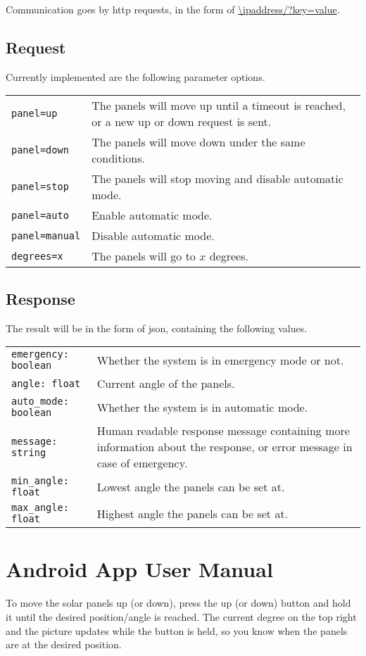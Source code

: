 

Communication goes by http requests, in the form of \url{\ipaddress/?key=value}.

\subsection{Request}
Currently implemented are the following parameter options.

\begin{tabular}{ll}
    \verb|panel=up| & The panels will move up until a timeout is reached, or a new up or down request is sent. \\
    \verb|panel=down| & The panels will move down under the same conditions. \\
    \verb|panel=stop| & The panels will stop moving and disable automatic mode. \\
    \verb|panel=auto| & Enable automatic mode. \\
    \verb|panel=manual| & Disable automatic mode. \\
    \verb|degrees=x| & The panels will go to $x$ degrees. \\
\end{tabular}

\subsection{Response}

The result will be in the form of json, containing the following values.

\begin{tabular}{ll}
    \verb|emergency: boolean| & Whether the system is in emergency mode or not. \\
    \verb|angle: float| & Current angle of the panels. \\
    \verb|auto_mode: boolean| & Whether the system is in automatic mode. \\
    \verb|message: string| & Human readable response message containing more information about the response, or error message in case of emergency. \\
    \verb|min_angle: float| & Lowest angle the panels can be set at. \\
    \verb|max_angle: float| & Highest angle the panels can be set at. \\
\end{tabular}

\section{Android App User Manual}\label{subsec:userManual}
To move the solar panels up (or down), press the up (or down) button and hold it until the desired position/angle is reached.
The current degree on the top right and the picture updates while the button is held, so you know when the panels are at the desired position.

